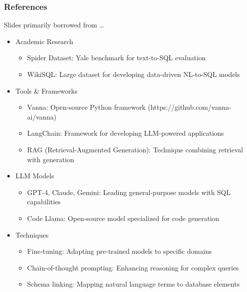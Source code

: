 \begin{frame}[fragile]\frametitle{References}
Slides primarily borrowed from \ldots

      \begin{itemize}
        \item Academic Research
          \begin{itemize}
            \item Spider Dataset: Yale benchmark for text-to-SQL evaluation
            \item WikiSQL: Large dataset for developing data-driven NL-to-SQL models
          \end{itemize}
        \item Tools \& Frameworks
          \begin{itemize}
            \item Vanna: Open-source Python framework (https://github.com/vanna-ai/vanna)
            \item LangChain: Framework for developing LLM-powered applications
            \item RAG (Retrieval-Augmented Generation): Technique combining retrieval with generation
          \end{itemize}
        \item LLM Models
          \begin{itemize}
            \item GPT-4, Claude, Gemini: Leading general-purpose models with SQL capabilities
            \item Code Llama: Open-source model specialized for code generation
          \end{itemize}
        \item Techniques
          \begin{itemize}
            \item Fine-tuning: Adapting pre-trained models to specific domains
            \item Chain-of-thought prompting: Enhancing reasoning for complex queries
            \item Schema linking: Mapping natural language terms to database elements
          \end{itemize}
      \end{itemize}

\end{frame}
